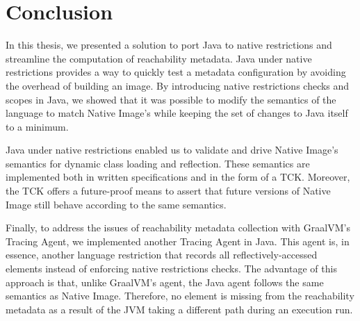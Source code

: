 \chapter{Conclusion}
% 

In this thesis, we presented a solution to port Java to native restrictions and streamline the computation of reachability metadata. 
Java under native restrictions provides a way to quickly test a metadata configuration by avoiding the overhead of building an image.
By introducing native restrictions checks and scopes in Java, we showed that it was possible to modify the semantics of the language to match Native Image's while keeping the set of changes to Java itself to a minimum.

Java under native restrictions enabled us to validate and drive Native Image's semantics for dynamic class loading and reflection. These semantics are implemented both in written specifications and in the form of a TCK. Moreover, the TCK offers a future-proof means to assert that future versions of Native Image still behave according to the same semantics. 

Finally, to address the issues of reachability metadata collection with GraalVM's Tracing Agent, we implemented another Tracing Agent in Java. This agent is, in essence, another language restriction that records all reflectively-accessed elements instead of enforcing native restrictions checks. The advantage of this approach is that, unlike GraalVM's agent, the Java agent follows the same semantics as Native Image. Therefore, no element is missing from the reachability metadata as a result of the JVM taking a different path during an execution run. 

